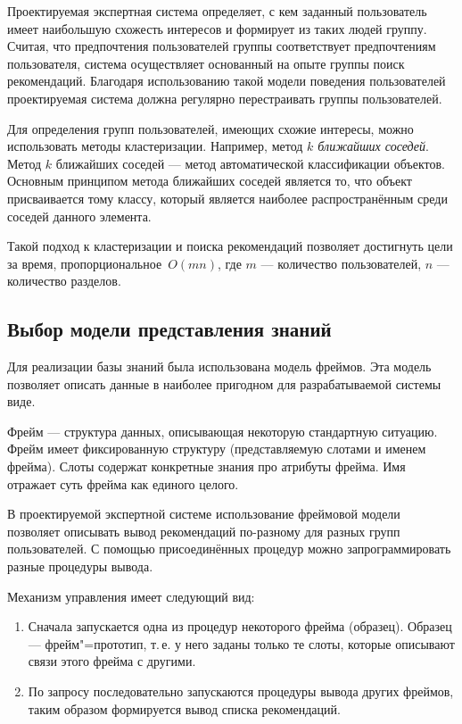 \documentclass[simple,14pt,utf8,russian]{eskdtext}
\begin{document}
            Проектируемая экспертная система определяет, с кем заданный пользователь имеет наибольшую схожесть
            интересов и формирует из таких людей группу.
            Считая, что предпочтения пользователей группы соответствует предпочтениям пользователя, система
            осуществляет основанный на опыте группы поиск рекомендаций.
            Благодаря использованию такой модели поведения пользователей проектируемая система должна регулярно
            перестраивать группы пользователей.

            Для определения групп пользователей, имеющих схожие интересы, можно использовать методы кластеризации.
            Например, метод \textit{$k$ ближайших соседей}.
            Метод $k$ ближайших соседей --- метод автоматической классификации объектов.
            Основным принципом метода ближайших соседей является то, что объект присваивается тому классу, который
            является наиболее распространённым среди соседей данного элемента.~\cite{book5}

            Такой подход к кластеризации и поиска рекомендаций позволяет достигнуть цели за время,
            пропорциональное~$O(mn)$, где $m$ --- количество пользователей, $n$ --- количество разделов.~\cite{book4}

    \subsection{Выбор модели представления знаний}
    \label{sec:model}
        Для реализации базы знаний была использована модель фреймов.
        Эта модель позволяет описать данные в наиболее пригодном для разрабатываемой системы виде.

        Фрейм --- структура данных, описывающая некоторую стандартную ситуацию.
        Фрейм имеет фиксированную структуру (представляемую слотами и именем фрейма).
        Слоты содержат конкретные знания про атрибуты фрейма.
        Имя отражает суть фрейма как единого целого.

        В проектируемой экспертной системе использование фреймовой модели позволяет описывать вывод рекомендаций
        по-разному для разных групп пользователей.
        С помощью присоединённых процедур можно запрограммировать разные процедуры вывода.

        Механизм управления имеет следующий вид:
        \begin{enumerate}
            \item Сначала запускается одна из процедур некоторого фрейма (образец).
                Образец --- фрейм"=прототип, т.\,е. у него заданы только те слоты, которые описывают связи этого
                фрейма с другими.
            \item По запросу последовательно запускаются процедуры вывода других фреймов, таким образом формируется
                вывод списка рекомендаций.
        \end{enumerate}
\end{document}

